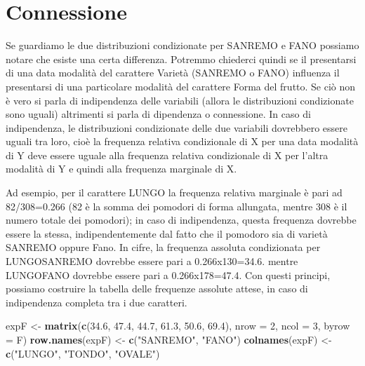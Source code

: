 \documentclass[a4paper,12pt,oneside]{book}
\newenvironment{Shaded}{\begin{snugshade}}{\end{snugshade}}
\newcommand{\KeywordTok}[1]{\textcolor[rgb]{0.13,0.29,0.53}{\textbf{#1}}}
\newcommand{\DataTypeTok}[1]{\textcolor[rgb]{0.13,0.29,0.53}{#1}}
\newcommand{\DecValTok}[1]{\textcolor[rgb]{0.00,0.00,0.81}{#1}}
\newcommand{\FloatTok}[1]{\textcolor[rgb]{0.00,0.00,0.81}{#1}}
\newcommand{\StringTok}[1]{\textcolor[rgb]{0.31,0.60,0.02}{#1}}
\newcommand{\NormalTok}[1]{#1}
\begin{document}
\chapter{Connessione}\label{connessione}

Se guardiamo le due distribuzioni condizionate per SANREMO e FANO
possiamo notare che esiste una certa differenza. Potremmo chiederci
quindi se il presentarsi di una data modalità del carattere Varietà
(SANREMO o FANO) influenza il presentarsi di una particolare modalità
del carattere Forma del frutto. Se ciò non è vero si parla di
indipendenza delle variabili (allora le distribuzioni condizionate sono
uguali) altrimenti si parla di dipendenza o connessione. In caso di
indipendenza, le distribuzioni condizionate delle due variabili
dovrebbero essere uguali tra loro, cioè la frequenza relativa
condizionale di X per una data modalità di Y deve essere uguale alla
frequenza relativa condizionale di X per l'altra modalità di Y e quindi
alla frequenza marginale di X.

Ad esempio, per il carattere LUNGO la frequenza relativa marginale è
pari ad 82/308=0.266 (82 è la somma dei pomodori di forma allungata,
mentre 308 è il numero totale dei pomodori); in caso di indipendenza,
questa frequenza dovrebbe essere la stessa, indipendentemente dal fatto
che il pomodoro sia di varietà SANREMO oppure Fano. In cifre, la
frequenza assoluta condizionata per LUNGO\textbar{}SANREMO dovrebbe
essere pari a 0.266x130=34.6. mentre LUNGO\textbar{}FANO dovrebbe essere
pari a 0.266x178=47.4. Con questi principi, possiamo costruire la
tabella delle frequenze assolute attese, in caso di indipendenza
completa tra i due caratteri.

\begin{Shaded}
\begin{Highlighting}[]
\NormalTok{expF <-}\StringTok{ }\KeywordTok{matrix}\NormalTok{(}\KeywordTok{c}\NormalTok{(}\FloatTok{34.6}\NormalTok{, }\FloatTok{47.4}\NormalTok{, }\FloatTok{44.7}\NormalTok{, }\FloatTok{61.3}\NormalTok{, }\FloatTok{50.6}\NormalTok{, }\FloatTok{69.4}\NormalTok{), }
                 \DataTypeTok{nrow =} \DecValTok{2}\NormalTok{, }\DataTypeTok{ncol =} \DecValTok{3}\NormalTok{,}
                 \DataTypeTok{byrow =}\NormalTok{ F)}
\KeywordTok{row.names}\NormalTok{(expF) <-}\StringTok{ }\KeywordTok{c}\NormalTok{(}\StringTok{"SANREMO"}\NormalTok{, }\StringTok{"FANO"}\NormalTok{)}
\KeywordTok{colnames}\NormalTok{(expF) <-}\StringTok{ }\KeywordTok{c}\NormalTok{(}\StringTok{"LUNGO"}\NormalTok{, }\StringTok{"TONDO"}\NormalTok{, }\StringTok{"OVALE"}\NormalTok{)}
\end{Highlighting}
\end{Shaded}
\end{document}
